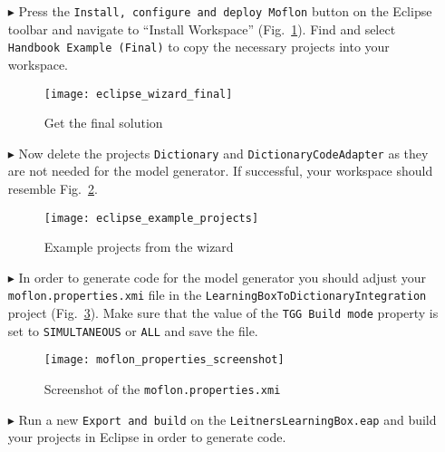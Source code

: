 \begin{itemize}
\renewcommand\figurename{Figure}
\item[$\blacktriangleright$] Press the \texttt{Install, configure and deploy Moflon} button on the Eclipse toolbar and navigate to ``Install Workspace''
(Fig.~\ref{eclipse:finalSolutionWizard}). Find and select \texttt{Handbook Example (Final)} to copy the necessary projects into your workspace.

\vspace{0.5cm}

\begin{figure}[htbp]
\begin{center}
  \texttt{[image: eclipse\_wizard\_final]}
  \caption{Get the final solution}
  \label{eclipse:finalSolutionWizard}
\end{center}
\end{figure}

\item[$\blacktriangleright$] Now delete the projects \texttt{Dictionary} and \texttt{DictionaryCodeAdapter} as they are not needed for the model generator. 
If successful, your workspace should resemble Fig.~\ref{eclipse:loadedDictionaryMetamodel}. 


\begin{figure}[htbp] 
\renewcommand\figurename{Figure}
\begin{center}
  \texttt{[image: eclipse\_example\_projects]}
  \caption{Example projects from the wizard}
  \label{eclipse:loadedDictionaryMetamodel}
\end{center}
\end{figure}


\item[$\blacktriangleright$] In order to generate code for the model generator you should adjust your \texttt{moflon.properties.xmi} file in the \texttt{Learning\-Box\-To\-Dictionary\-Integration} project (Fig.~\ref{fig:moflon_properties_screenshot}).
Make sure that the value of the \texttt{TGG Build mode}
property is set to \texttt{SIMULTANEOUS} or \texttt{ALL} and save the file.


\begin{figure}[h]
\renewcommand\figurename{Figure}
\centering 
\texttt{[image: moflon\_properties\_screenshot]}
\caption{Screenshot of the \texttt{moflon.properties.xmi}}
\label{fig:moflon_properties_screenshot}
\end{figure}

\item[$\blacktriangleright$] Run a new \texttt{Export and build} on the \texttt{LeitnersLearningBox.eap} and build your projects in Eclipse in order to generate code. 


\end{itemize}
 
